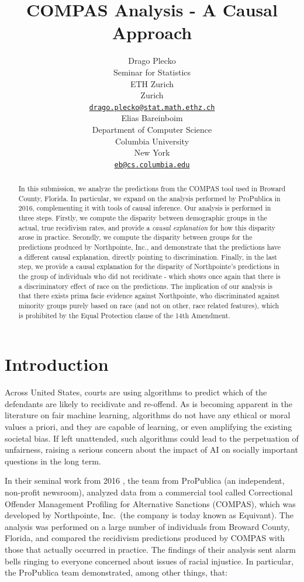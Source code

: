 \documentclass{article}
\title{COMPAS Analysis - A Causal Approach}
\author{
    Drago Plecko
   \\
    Seminar for Statistics \\
    ETH Zurich \\
  Zurich \\
  \texttt{\href{mailto:drago.plecko@stat.math.ethz.ch}{\nolinkurl{drago.plecko@stat.math.ethz.ch}}} \\
   \And
    Elias Bareinboim
   \\
    Department of Computer Science \\
    Columbia University \\
  New York \\
  \texttt{\href{mailto:eb@cs.columbia.edu}{\nolinkurl{eb@cs.columbia.edu}}} \\
  }
\begin{document}
\maketitle


\begin{abstract}
In this submission, we analyze the predictions from the COMPAS tool used
in Broward County, Florida. In particular, we expand on the analysis
performed by ProPublica in 2016, complementing it with tools of causal
inference. Our analysis is performed in three steps. Firstly, we compute
the disparity between demographic groups in the actual, true recidivism
rates, and provide a \emph{causal explanation} for how this disparity
arose in practice. Secondly, we compute the disparity between groups for
the predictions produced by Northpointe, Inc., and demonstrate that the
predictions have a different causal explanation, directly pointing to
discrimination. Finally, in the last step, we provide a causal
explanation for the disparity of Northpointe's predictions in the group
of individuals who did not recidivate - which shows once again that
there is a discriminatory effect of race on the predictions. The
implication of our analysis is that there exists prima facie evidence
against Northpointe, who discriminated against minority groups purely
based on race (and not on other, race related features), which is
prohibited by the Equal Protection clause of the 14th Amendment.
\end{abstract}


\hypertarget{introduction}{%
\section{Introduction}\label{introduction}}

Across United States, courts are using algorithms to predict which of
the defendants are likely to recidivate and re-offend. As is becoming
apparent in the literature on fair machine learning, algorithms do not
have any ethical or moral values a priori, and they are capable of
learning, or even amplifying the existing societal bias. If left
unattended, such algorithms could lead to the perpetuation of
unfairness, raising a serious concern about the impact of AI on socially
important questions in the long term.

In their seminal work from 2016 \cite{larson2016recidivism}, the team
from ProPublica (an independent, non-profit newsroom), analyzed data
from a commercial tool called Correctional Offender Management Profiling
for Alternative Sanctions (COMPAS), which was developed by Northpointe,
Inc.~(the company is today known as Equivant). The analysis was
performed on a large number of individuals from Broward County, Florida,
and compared the recidivism predictions produced by COMPAS with those
that actually occurred in practice. The findings of their analysis sent
alarm bells ringing to everyone concerned about issues of racial
injustice. In particular, the ProPublica team demonstrated, among other
things, that:
\end{document}
